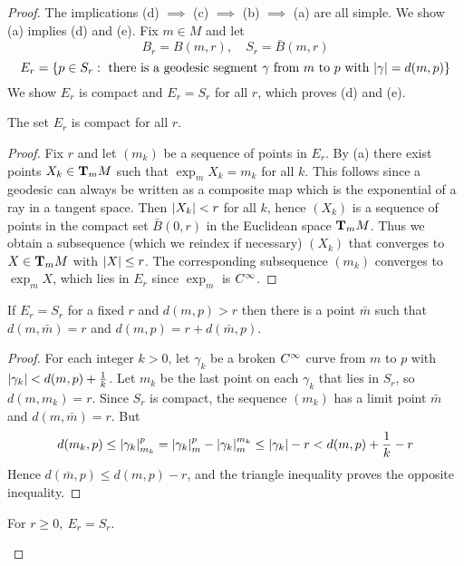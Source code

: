 \documentclass[../main]{subfiles}
\begin{document}
\begin{proof}
The implications (d) $\implies$ (c) $\implies$ (b) $\implies$ (a) are all simple. We show (a) implies (d) and (e). Fix $m\in M$ and let
\[B_r = B(m,r),
\quad S_r = \bar B(m,r)\]
\[E_r = \brc{p\in S_r: \text{ there is a geodesic segment $\gamma$ from $m$ to $p$ with $\norm\gamma=d(m,p)$}}\]
We show $E_r$ is compact and $E_r=S_r$ for all $r$, which proves (d) and (e).


\begin{lemma} \label{lem:ch10.5.1a}
The set $E_r$ is compact for all $r$.
\end{lemma}

\begin{proof}
Fix $r$ and let $(m_k)$ be a sequence of points in $E_r$. By (a) there exist points $X_k\in\ts Mm$ such that $\exp_mX_k=m_k$ for all $k$. This follows since a geodesic can always be written as a composite map which is the exponential of a ray in a tangent space. Then $\norm{X_k}<r$ for all $k$, hence $(X_k)$ is a sequence of points in the compact set $\bar B(0,r)$ in the Euclidean space $\ts Mm$. Thus we obtain a subsequence (which we reindex if necessary) $(X_k)$ that converges to $X\in\ts Mm$ with $\norm X\le r$. The corresponding subsequence $(m_k)$ converges to $\exp_mX$, which lies in $E_r$ since $\exp_m$ is $\CInfty$.
\end{proof}


\begin{lemma} \label{lem:ch10.5.1b}
If $E_r=S_r$ for a fixed $r$ and $d(m,p)>r$ then there is a point $\bar m$ such that $d(m,\bar m)=r$ and $d(m,p)=r+d(\bar m,p)$.
\end{lemma}

\begin{proof}
For each integer $k>0$, let $\gamma_k$ be a broken $\CInfty$ curve from $m$ to $p$ with $\norm{\gamma_k}<d(m,p)+\frac1k$. Let $m_k$ be the last point on each $\gamma_k$ that lies in $S_r$, so $d(m,m_k)=r$. Since $S_r$ is compact, the sequence $(m_k)$ has a limit point $\bar m$ and $d(m,\bar m)=r$. But
\[d(m_k,p) \le \norm{\gamma_k}_{m_k}^p
= \norm{\gamma_k}_m^p - \norm{\gamma_k}_m^{m_k}
\le \norm{\gamma_k} - r
< d(m,p) + \frac1k - r\]
Hence $d(\bar m,p)\le d(m,p)-r$, and the triangle inequality proves the opposite inequality.
\end{proof}


\begin{lemma} \label{lem:ch10.5.1c}
For $r\ge0,~E_r=S_r$.
\end{lemma}


\end{proof}
\end{document}
